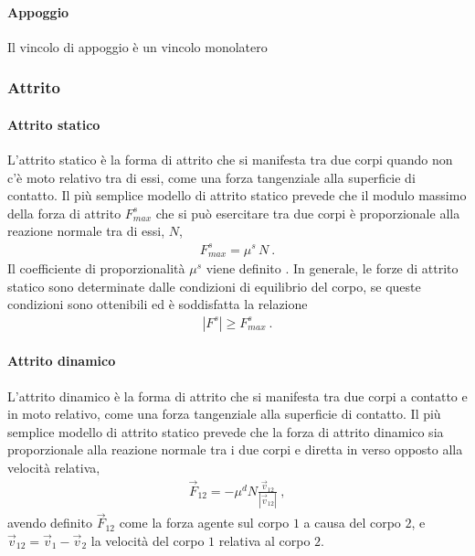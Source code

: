 \documentclass[letterpaper,10pt,italian]{jupyterBook}
\begin{document}
\paragraph{Appoggio}
\label{\detokenize{ch/mechanics/actions-examples:appoggio}}
\sphinxAtStartPar
Il vincolo di appoggio è un vincolo monolatero  


\subsubsection{Attrito}
\label{\detokenize{ch/mechanics/actions-examples:attrito}}

\paragraph{Attrito statico}
\label{\detokenize{ch/mechanics/actions-examples:attrito-statico}}
\sphinxAtStartPar
L’attrito statico è la forma di attrito che si manifesta tra due corpi quando non c’è moto relativo tra di essi, come una forza tangenziale alla superficie di contatto. Il più semplice modello di attrito statico prevede che il modulo massimo della forza di attrito \(F^s_{max}\) che si può esercitare tra due corpi è proporzionale alla reazione normale tra di essi, \(N\),
\begin{equation*}
\begin{split}F^s_{max} = \mu^s \, N \ .\end{split}
\end{equation*}
\sphinxAtStartPar
Il coefficiente di proporzionalità \(\mu^s\) viene definito . In generale, le forze di attrito statico sono determinate dalle condizioni di equilibrio del corpo, se queste condizioni sono ottenibili ed  è soddisfatta la relazione
\begin{equation*}
\begin{split}|F^s| \ge F^s_{max} \ .\end{split}
\end{equation*}

\paragraph{Attrito dinamico}
\label{\detokenize{ch/mechanics/actions-examples:attrito-dinamico}}
\sphinxAtStartPar
L’attrito dinamico è la forma di attrito che si manifesta tra due corpi a contatto e in moto relativo, come una forza tangenziale alla superficie di contatto. Il più semplice modello di attrito statico prevede che la forza di attrito dinamico sia proporzionale alla reazione normale tra i due corpi e diretta in verso opposto alla velocità relativa,
\begin{equation*}
\begin{split}\vec{F}_{12} = - \mu^d N \frac{\vec{v}_{12}}{|\vec{v}_{12}|} \ ,\end{split}
\end{equation*}
\sphinxAtStartPar
avendo definito \(\vec{F}_{12}\) come la forza agente sul corpo \(1\) a causa del corpo \(2\), e \(\vec{v}_{12} = \vec{v}_1 - \vec{v}_2\) la velocità del corpo \(1\) relativa al corpo \(2\).
\end{document}
